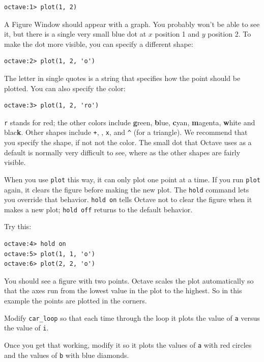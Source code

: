 \documentclass{book}
\begin{document}
\begin{verbatim}
octave:1> plot(1, 2)
\end{verbatim}

A {\sf Figure Window} should appear with a graph. You probably won't be able to
see it, but there is a single very small blue dot
at $x$ position 1 and $y$ position 2. To make the dot more visible,
you can specify a different shape:

\begin{verbatim}
octave:2> plot(1, 2, 'o')
\end{verbatim}

The letter in single quotes is a string that specifies how the
point should be plotted. You can also specify the color:

\begin{verbatim}
octave:3> plot(1, 2, 'ro')
\end{verbatim}

{\tt r} stands for red; the other colors include {\bf g}reen, {\bf
b}lue, {\bf c}yan, {\bf m}agenta, {\bf w}hite and blac{\bf k}.
Other shapes include {\tt +}, 
{\tt *}, 
{\tt x}, and 
\verb+^+ (for a triangle). 
We recommend that you specify the shape, if not not the color. The small dot
that Octave uses as a default is normally very difficult to see, where as the
other shapes are fairly visible.

When you use {\tt plot} this way, it can only plot one point at a
time. If you run {\tt plot} again, it clears the figure before making
the new plot. The {\tt hold} command lets you override that behavior.
{\tt hold on} tells Octave not to clear the figure when it makes a new
plot; {\tt hold off} returns to the default behavior.

Try this:

\begin{verbatim}
octave:4> hold on
octave:5> plot(1, 1, 'o')
octave:6> plot(2, 2, 'o')
\end{verbatim}

You should see a figure with two points. Octave scales
the plot automatically so that the axes run from the lowest value in
the plot to the highest. So in this example the points are plotted in
the corners.

\begin{ex}
Modify {\tt car\_loop} so that each time through the
loop it plots the value of {\tt a} versus the value of {\tt i}.

Once you get that working, modify it so it plots the values of {\tt a}
with red circles and the values of {\tt b} with blue diamonds.

\end{ex}
\end{document}
